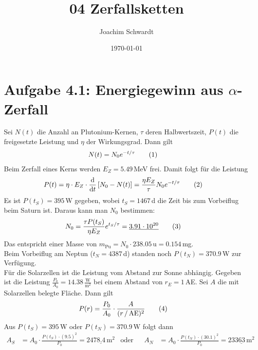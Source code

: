 \documentclass[a4paper,12pt]{article}
\newcommand\numberthis{\addtocounter{equation}{1}\tag{\theequation}}
\newcommand{\klam}{}
\newcommand{\tecxt}{}
\begin{document}
\title{04 Zerfallsketten}
\author{Joachim Schwardt}
\date{\today}
\maketitle

\section*{Aufgabe 4.1: Energiegewinn aus $\alpha$-Zerfall}
Sei $N(t)$ die Anzahl an Plutonium-Kernen, $\tau$ deren Halbwertszeit, $P(t)$ die freigesetzte Leistung und $\eta$ der Wirkungsgrad. Dann gilt 
\begin{align*}
N(t)&=N_0e^{-t/\tau}\numberthis\label{eqn:N von t}
\end{align*}
Beim Zerfall eines Kerns werden $E_Z=5.49\,$MeV frei. Damit folgt für die Leistung
\begin{align*}
P(t)&=\eta\cdot E_Z\cdot\frac{\tecxt\text{d}}{\tecxt\text{d}t}\klam\left[ {N_0-N(t)} \right]=\frac{\eta E_Z}{\tau}N_0e^{-t/\tau}\numberthis\label{eqn:P von t}
\end{align*}
Es ist $P(t_S)=395\,$W gegeben, wobei $t_S=1467\,$d die Zeit bis zum Vorbeiflug beim Saturn ist. Daraus kann man $N_0$ bestimmen:
\begin{align*}
N_0&=\frac{\tau P(t_S)}{\eta E_Z}e^{t_S/\tau}=\underline{3.91\cdot 10^{20}}\numberthis\label{eqn:N0}
\end{align*}
Das entspricht einer Masse von $m_\tecxt\text{Pu}=N_0\cdot 238.05\,\tecxt\text{u}=0.154\,$mg. \\
Beim Vorbeiflug am Neptun ($t_N=4387\,$d) standen noch $P(t_N)=370.9\,$W zur Verfügung.\\
Für die Solarzellen ist die Leistung vom Abstand zur Sonne abhängig. Gegeben ist die Leistung $\frac{P_0}{A_0}=14.38\,\frac{\tecxt\text{W}}{\tecxt\text{m}^2}$ bei einem Abstand von $r_E=1\,$AE. Sei $A$ die mit Solarzellen belegte Fläche. Dann gilt
\begin{align*}
P(r)&=\frac{P_0}{A_0}\cdot\frac{A}{(r\,/\,\tecxt\text{AE})^2}\numberthis\label{eqn:P von r}
\end{align*} 
Aus $P(t_S)=395\,$W oder $P(t_N)=370.9\,$W folgt dann 
\begin{align*}
A_S&=A_0\cdot \frac{P(t_S)\cdot (9.5)^2}{P_0}=\underline{2478.4\,\tecxt\text{m}^2}&\tecxt\text{oder}&& A_N&=A_0\cdot \frac{P(t_N)\cdot (30.1)^2}{P_0}=\underline{23363\,\tecxt\text{m}^2}
\end{align*}
\end{document}
